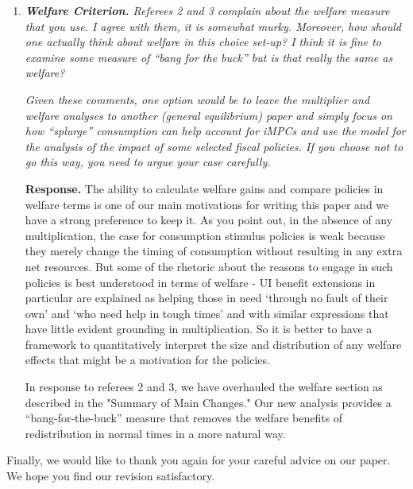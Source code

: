 \documentclass[12pt,letterpaper,english]{article}
\begin{document}
\begin{enumerate}
\item \textit{\textbf{Welfare Criterion.} Referees 2 and 3 complain about the welfare measure that you use. I agree with them, it is somewhat murky. Moreover, how should one	actually think about welfare in this choice set-up? I think it is fine to examine some	measure of ``bang for the buck'' but is that really the same as welfare?} 

\textit{Given these comments, one option would be to leave the multiplier and welfare	analyses to another (general equilibrium) paper and simply focus on how ``splurge''	consumption can help account for iMPCs and use the model for the analysis of the impact of some selected fiscal policies. If you choose not to go this way, you need to argue your case carefully.}	

\noindent \textbf{Response.} The ability to calculate welfare gains and compare policies in welfare terms is one of our main motivations for writing this paper and we have a strong preference to keep it. As you point out, in the absence of any multiplication, the case for consumption stimulus policies is weak because they merely change the timing of consumption without resulting in any extra net resources. But some of the rhetoric about the reasons to engage in such policies is best understood in terms of welfare - UI benefit extensions in particular are explained as helping those in need `through no fault of their own' and `who need help in tough times' and with similar expressions that have little evident grounding in multiplication. So it is better to have a framework to quantitatively interpret the size and distribution of any welfare effects that might be a motivation for the policies.

In response to referees 2 and 3, we have overhauled the welfare section as described in the "Summary of Main Changes." Our new analysis provides a ``bang-for-the-buck'' measure that removes the welfare benefits of redistribution in normal times in a more natural way.


\end{enumerate}

\bigskip

\noindent Finally, we would like to thank you again for your careful advice on our paper. We hope you find our revision satisfactory.

%

\end{document}
